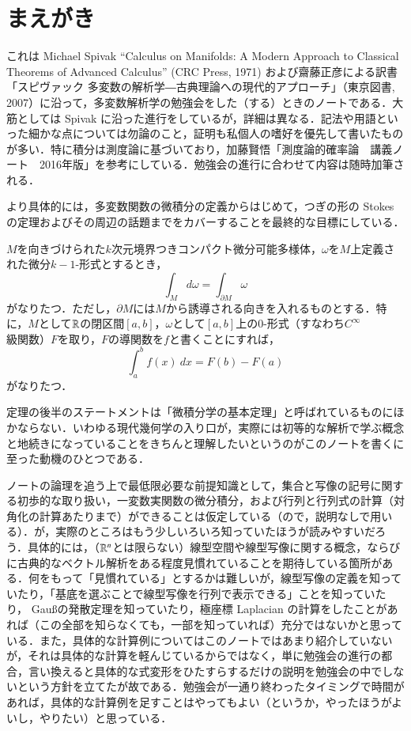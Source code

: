 \section*{まえがき}

これは Michael Spivak ``Calculus on Manifolds: A Modern Approach to Classical Theorems of Advanced Calculus'' (CRC Press, 1971) および齋藤正彦による訳書「スピヴァック 多変数の解析学―古典理論への現代的アプローチ」（東京図書, 2007）に沿って，多変数解析学の勉強会をした（する）ときのノートである．大筋としては Spivak に沿った進行をしているが，詳細は異なる．記法や用語といった細かな点については勿論のこと，証明も私個人の嗜好を優先して書いたものが多い．特に積分は測度論に基づいており，加藤賢悟「測度論的確率論　講義ノート　2016年版」を参考にしている．勉強会の進行に合わせて内容は随時加筆される．

より具体的には，多変数関数の微積分の定義からはじめて，つぎの形の Stokes の定理およびその周辺の話題までをカバーすることを最終的な目標にしている．
\begin{thm*}
$M$を向きづけられた$k$次元境界つきコンパクト微分可能多様体，$\omega$を$M$上定義された微分$k-1$-形式とするとき，
\begin{equation}
\int_M d\omega = \int_{\partial M} \omega
\end{equation}がなりたつ．ただし，$\partial M$には$M$から誘導される向きを入れるものとする．特に，$M$として$\mathbb{R}$の閉区間$[a,b]$，$\omega$として$[a,b]$上の0-形式（すなわち$C^\infty$級関数）$F$を取り，$F$の導関数を$f$と書くことにすれば，
\begin{equation}
\int_a^b f(x)\ dx = F(b) - F(a)
\end{equation}がなりたつ．
\end{thm*}
定理の後半のステートメントは「微積分学の基本定理」と呼ばれているものにほかならない．いわゆる現代幾何学の入り口が，実際には初等的な解析で学ぶ概念と地続きになっていることをきちんと理解したいというのがこのノートを書くに至った動機のひとつである．

ノートの論理を追う上で最低限必要な前提知識として，集合と写像の記号に関する初歩的な取り扱い，一変数実関数の微分積分，および行列と行列式の計算（対角化の計算あたりまで）ができることは仮定している（ので，説明なしで用いる）．が，実際のところはもう少しいろいろ知っていたほうが読みやすいだろう．具体的には，（$\mathbb{R}^n$とは限らない）線型空間や線型写像に関する概念，ならびに古典的なベクトル解析をある程度見慣れていることを期待している箇所がある．何をもって「見慣れている」とするかは難しいが，線型写像の定義を知っていたり，「基底を選ぶことで線型写像を行列で表示できる」ことを知っていたり， Gau\ss の発散定理を知っていたり，極座標 Laplacian の計算をしたことがあれば（この全部を知らなくても，一部を知っていれば）充分ではないかと思っている．また，具体的な計算例についてはこのノートではあまり紹介していないが，それは具体的な計算を軽んじているからではなく，単に勉強会の進行の都合，言い換えると具体的な式変形をひたすらするだけの説明を勉強会の中でしないという方針を立てたが故である．勉強会が一通り終わったタイミングで時間があれば，具体的な計算例を足すことはやってもよい（というか，やったほうがよいし，やりたい）と思っている．


